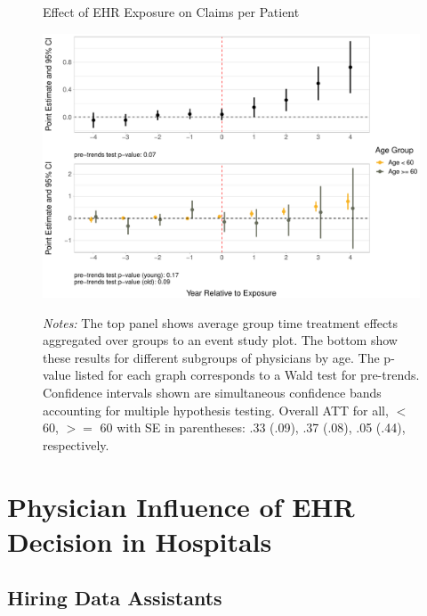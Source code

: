 \documentclass[12pt]{article}
\begin{document}
\begin{figure}[ht]
    \centering
    \captionsetup{width=.85\linewidth}
    \caption{Effect of EHR Exposure on Claims per Patient}
    \includegraphics[scale=.6]{Objects/claim_per_patient_plot.pdf}
    \label{fig:claim}
    \vspace{2mm}
    \caption*{\footnotesize{\textit{Notes:} The top panel shows average group time treatment effects aggregated over groups to an event study plot. The bottom show these results for different subgroups of physicians by age. The p-value listed for each graph corresponds to a Wald test for pre-trends. Confidence intervals shown are simultaneous confidence bands accounting for multiple hypothesis testing. Overall ATT for all, $<$ 60, $>=$ 60 with SE in parentheses: .33 (.09), .37 (.08), .05 (.44), respectively.}}
\end{figure}



\section{Physician Influence of EHR Decision in Hospitals}

\subsection{Hiring Data Assistants}\label{sec:dataass}
\end{document}
